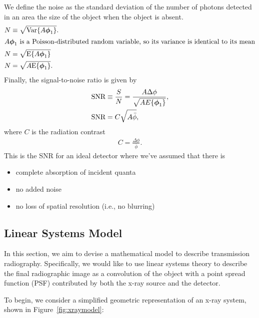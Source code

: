 \documentclass[mphy386-notes.tex]{subfiles}
\begin{document}
We define the noise as the standard deviation of the number of photons detected
in an area the size of the object when the object is absent. 
\begin{align}
  N &\equiv \sqrt{\text{Var}\{A\boldsymbol{\phi}_1\}}.\\
  \intertext{$A\boldsymbol{\phi}_1$ is a Poisson-distributed random variable, so its variance is identical to its mean}
  N &= \sqrt{\text{E}\{A\boldsymbol{\phi}_1\}}\\
  N &= \sqrt{A\text{E}\{\boldsymbol{\phi}_1\}}.
\end{align}
Finally, the signal-to-noise ratio is given by
 \begin{align}
   \text{SNR} &\equiv \frac{S}{N} = \frac{A\Delta\phi}{\sqrt{AE\{\boldsymbol{\phi}_1\}}},\\
   \text{SNR} &= C\sqrt{A\bar{\phi}}, \label{eq:snrcontrast}
 \end{align}   
where $C$ is the radiation contrast
\begin{align}
  C = \frac{\Delta\phi}{\bar{\phi}}.
\end{align}
This is the SNR for an ideal detector where we've assumed that there is
\begin{itemize}
\item complete absorption of incident quanta
\item no added noise
\item no loss of spatial resolution (i.e., no blurring)
\end{itemize}


\subsection{Linear Systems Model}

In this section, we aim to devise a mathematical model to
describe transmission radiography. Specifically, we would like to
use linear systems theory to describe the final radiographic
image as a convolution of the object with a point spread function (PSF)
contributed by both the x-ray source and the detector.

To begin, we consider a simplified geometric representation of an x-ray
system, shown in Figure~\ref{fig:xraymodel}:

\end{document}
